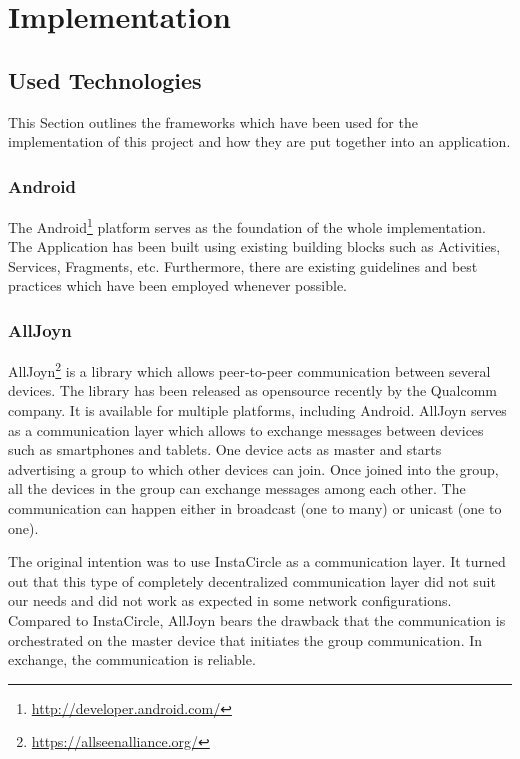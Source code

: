 \documentclass[numbers=noenddot, abstract=on, a4paper, headsepline,
footsepline, oneside, draft=off]{scrreprt}
\begin{document}
\section{Implementation}
\label{sec:implementation}


\subsection{Used Technologies}
This Section outlines the frameworks which have been used for the implementation
of this project and how they are put together into an application.
\subsubsection{Android}
The Android\footnote{\url{http://developer.android.com/}} platform serves as the
foundation of the whole implementation. The Application has been built using existing building blocks such as Activities,
Services, Fragments, etc. Furthermore, there are existing guidelines and best
practices which have been employed whenever possible. 



\subsubsection{AllJoyn}
AllJoyn\footnote{\url{https://allseenalliance.org/}} is a library which allows
peer-to-peer communication between several devices. The library has been
released as opensource recently by the Qualcomm company. It is available for
multiple platforms, including Android. AllJoyn serves as a communication layer
which allows to exchange messages between devices such as smartphones and
tablets. One device acts as master and starts advertising a group to which other
devices can join. Once joined into the group, all the devices in the group can
exchange messages among each other. The communication can happen either in
broadcast (one to many) or unicast (one to one).

The original intention was to use InstaCircle \cite{ritter13a} as a
communication layer. It turned out that this type of completely decentralized
communication layer did not suit our needs and did not work as expected in some
network configurations. Compared to InstaCircle, AllJoyn bears the drawback that
the communication is orchestrated on the master device that initiates the group
communication. In exchange, the communication is reliable.
\end{document}
